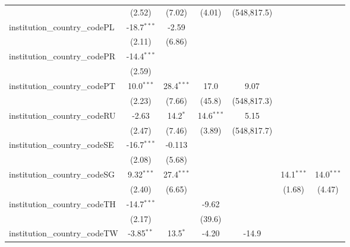 \begin{tabular}{lcccccc}
                                         & (2.52)        & (7.02)        & (4.01)        & (548,817.5)   &               &   \\   
   institution\_country\_codePL          & -18.7$^{***}$ & -2.59         &               &               &               &   \\   
                                         & (2.11)        & (6.86)        &               &               &               &   \\   
   institution\_country\_codePR          & -14.4$^{***}$ &               &               &               &               &   \\   
                                         & (2.59)        &               &               &               &               &   \\   
   institution\_country\_codePT          & 10.0$^{***}$  & 28.4$^{***}$  & 17.0          & 9.07          &               &   \\   
                                         & (2.23)        & (7.66)        & (45.8)        & (548,817.3)   &               &   \\   
   institution\_country\_codeRU          & -2.63         & 14.2$^{*}$    & 14.6$^{***}$  & 5.15          &               &   \\   
                                         & (2.47)        & (7.46)        & (3.89)        & (548,817.7)   &               &   \\   
   institution\_country\_codeSE          & -16.7$^{***}$ & -0.113        &               &               &               &   \\   
                                         & (2.08)        & (5.68)        &               &               &               &   \\   
   institution\_country\_codeSG          & 9.32$^{***}$  & 27.4$^{***}$  &               &               & 14.1$^{***}$  & 14.0$^{***}$\\   
                                         & (2.40)        & (6.65)        &               &               & (1.68)        & (4.47)\\   
   institution\_country\_codeTH          & -14.7$^{***}$ &               & -9.62         &               &               &   \\   
                                         & (2.17)        &               & (39.6)        &               &               &   \\   
   institution\_country\_codeTW          & -3.85$^{**}$  & 13.5$^{*}$    & -4.20         & -14.9         &               &   \\   

\end{tabular}
